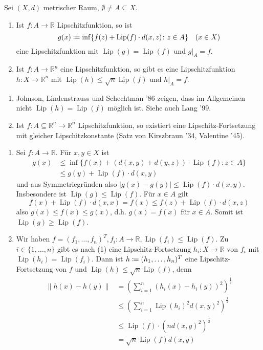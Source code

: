 \documentclass[a4paper,twoside,DIV15,BCOR12mm]{scrbook}
\DeclareMathOperator{\Lip}{Lip}
\begin{document}
\begin{satz}
Sei \((X,d)\) metrischer Raum, \(\emptyset \neq A \subseteq X\).
\begin{enumerate}[(1)]
\item Ist \(f: A \rightarrow \mathbb R\) Lipschitzfunktion, so ist
\[
g(x) \da \inf\{f(z)+\Lip(f) \cdot d(x,z) \colon z\in A\} \quad (x\in X)
\]
eine Lipschitzfunktion mit \(\Lip(g) = \Lip(f)\) und \(g|_A=f\).
\item Ist \(f: A \rightarrow \mathbb R^n\) eine Lipschitzfunktion, so gibt es eine Lipschitzfunktion \(h: X \rightarrow \mathbb R^n\) mit \(\Lip(h) \leq \sqrt n \Lip(f)\) und \(h|_A = f\).
\end{enumerate}
\end{satz}

\begin{bemerkung}
\begin{enumerate}[(1)]
\item Johnson, Lindenstrauss und Schechtman '86 zeigen, dass im Allgemeinen nicht \(\Lip(h) = \Lip(f)\) möglich ist. 
Siehe auch Lang '99.
\item Ist \(f: A \subseteq \mathbb R^n \rightarrow \mathbb R^n\) Lipschitzfunktion, so existiert eine Lipschitz-Fortsetzung mit gleicher Lipschitzkonstante (Satz von Kirszbraun '34, Valentine '45).
\end{enumerate}
\end{bemerkung}

\begin{beweis}
\begin{enumerate}[(1)]
\item Sei \(f: A\rightarrow \mathbb R\). Für \(x,y \in X\) ist
\begin{align*}
g(x) &\leq \inf\{f(x)+(d(x,y)+d(y,z))\cdot \Lip(f) \colon z \in A\} \\
&\leq g(y) + \Lip(f)\cdot d(x,y)
\end{align*}
und aus Symmetriegründen also \(|g(x)-g(y)| \leq \Lip(f) \cdot d(x,y)\). Insbesondere ist \(\Lip(g) \leq \Lip(f)\). Für \(x\in A\) gilt
\[
f(x) + \Lip(f)\cdot d(x,x) = f(x) \leq f(z)+ \Lip(f)\cdot  d(x,z)
\]
also \(g(x) \leq f(x) \leq g(x)\), d.h. \(g(x) = f(x)\) für \(x\in A\). Somit ist \(\Lip(g) \geq \Lip(f)\).
\item Wir haben \(f=(f_1,\ldots,f_n)^T, f_i: A \rightarrow \mathbb R, \Lip(f_i) \leq \Lip(f)\). Zu \(i\in \{1,\ldots,n\}\) gibt es nach (1) eine Lipschitz-Fortsetzung \(h_i: X \rightarrow \mathbb R\) von \(f_i\) mit \(\Lip(h_i)=\Lip(f_i)\). Dann ist \(h\da (h_1,\ldots,h_n)^T\) eine Lipschitz-Fortsetzung von \(f\) und \(\Lip(h) \leq \sqrt n \Lip(f)\), denn
\begin{align*}
\|h(x)-h(y)\| &= \left( \sum_{i=1}^n (h_i(x)-h_i(y))^2 \right)^{\frac12} \\
&\leq \left( \sum_{i=1}^n \Lip(h_i)^2 d(x,y)^2 \right)^{\frac12} \\
&\leq \Lip(f) \cdot (n d(x,y)^2)^{\frac12} \\
&= \sqrt n \Lip(f) d(x,y)
\end{align*}
\end{enumerate}
\end{beweis}
\end{document}
